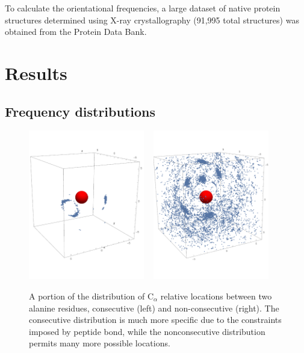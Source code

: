 \documentclass[11pt,titlepage]{article}
\begin{document}
To calculate the orientational frequencies, a large dataset of native protein structures determined using X-ray crystallography (91,995 total structures) was obtained from the Protein Data Bank.

\section{Results}
\subsection{Frequency distributions}
\begin{figure}
	\begin{center}
		\includegraphics[trim={0 3cm 0 3cm}, clip=true, width=0.45\textwidth]{consec_alpha_frequencies}\,\,\,\,\,
		\includegraphics[trim={0 3cm 0 3cm}, clip=true, width=0.45\textwidth]{nonconsec_alpha_frequencies}
		\caption{A portion of the distribution of C$_\alpha$ relative locations between two alanine residues, consecutive (left) and non-consecutive (right). The consecutive distribution is much more specific due to the constraints imposed by peptide bond, while the nonconsecutive distribution permits many more possible locations.}
		\label{alpha_frequencies}
	\end{center}
\end{figure}
\end{document}
